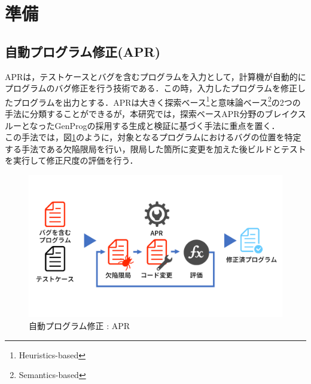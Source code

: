 \documentclass[uplatex,dvipdfmx,a4paper]{jsarticle}
\let\oldcite\cite
\renewcommand{\cite}[1]{\xspace\oldcite{#1}}
\begin{document}
\clearpage
\section{準備}\label{sec:prep}
\subsection{自動プログラム修正(APR)}\label{sec:apr}
APRは，テストケースとバグを含むプログラムを入力として，計算機が自動的にプログラムのバグ修正を行う技術である．この時，入力したプログラムを修正したプログラムを出力とする．APRは大きく探索ベース\footnote{Heuristics-based}と意味論ベース\footnote{Semantics-based}\cite{le2018overfitting}の2つの手法に分類することができるが，本研究では，探索ベースAPR分野のブレイクスルーとなったGenProg\cite{le2011genprog}の採用する生成と検証\cite{martinez2019astor}に基づく手法に重点を置く．\\
この手法では，図\ref{fig:apr}のように，対象となるプログラムにおけるバグの位置を特定する手法である欠陥限局を行い，限局した箇所に変更を加えた後ビルドとテストを実行して修正尺度の評価を行う．
\begin{figure}[t]
  \centering
  \includegraphics[width=\linewidth]{fig/apr.pdf}
  \caption{自動プログラム修正 : APR}
  \label{fig:apr}
\end{figure}
\end{document}
